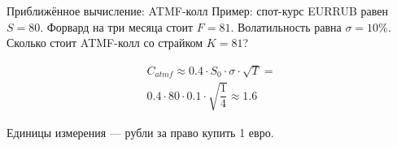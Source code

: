 \documentclass{beamer}
\begin{document}
\begin{frame}{Приближённое вычисление: ATMF-колл}
\justify
Пример: спот-курс EURRUB равен $S=80$. Форвард на три месяца стоит $F=81$. Волатильность равна $\sigma=10\%$. Сколько стоит ATMF-колл со страйком $K=81$?

\begin{align*}
C_{atmf} \approx 0.4 \cdot S_0 \cdot \sigma \cdot \sqrt{T} = \\
0.4 \cdot 80 \cdot 0.1 \cdot \sqrt{\dfrac{1}{4}} \approx 1.6
\end{align*}

Единицы измерения --- рубли за право купить 1 евро.
\end{frame}
\end{document}
